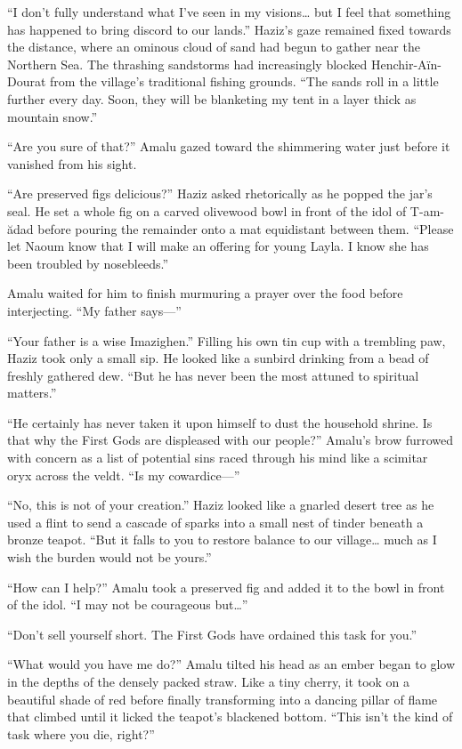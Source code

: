 ``I don't fully understand what I've seen in my visions\ldots{} but I feel that something has happened to bring discord to our lands.'' Haziz's gaze remained fixed towards the distance, where an ominous cloud of sand had begun to gather near the Northern Sea. The thrashing sandstorms had increasingly blocked Henchir-Aïn-Dourat from the village’s traditional fishing grounds. ``The sands roll in a little further every day. Soon, they will be blanketing my tent in a layer thick as mountain snow.''

``Are you sure of that?'' Amalu gazed toward the shimmering water just before it vanished from his sight.

``Are preserved figs delicious?'' Haziz asked rhetorically as he popped the jar's seal. He set a whole fig on a carved olivewood bowl in front of the idol of T-am-ădad before pouring the remainder onto a mat equidistant between them. ``Please let Naoum know that I will make an offering for young Layla. I know she has been troubled by nosebleeds.''

Amalu waited for him to finish murmuring a prayer over the food before interjecting. ``My father says---''

``Your father is a wise Imazighen.'' Filling his own tin cup with a trembling paw, Haziz took only a small sip. He looked like a sunbird drinking from a bead of freshly gathered dew. ``But he has never been the most attuned to spiritual matters.''

``He certainly has never taken it upon himself to dust the household shrine. Is that why the First Gods are displeased with our people?'' Amalu's brow furrowed with concern as a list of potential sins raced through his mind like a scimitar oryx across the veldt. ``Is my cowardice---''

``No, this is not of your creation.'' Haziz looked like a gnarled desert tree as he used a flint to send a cascade of sparks into a small nest of tinder beneath a bronze teapot. ``But it falls to you to restore balance to our village\ldots{} much as I wish the burden would not be yours.''

``How can I help?'' Amalu took a preserved fig and added it to the bowl in front of the idol. ``I may not be courageous but\ldots''

``Don't sell yourself short. The First Gods have ordained this task for you.''

``What would you have me do?'' Amalu tilted his head as an ember began to glow in the depths of the densely packed straw. Like a tiny cherry, it took on a beautiful shade of red before finally transforming into a dancing pillar of flame that climbed until it licked the teapot's blackened bottom. ``This isn't the kind of task where you die, right?''

